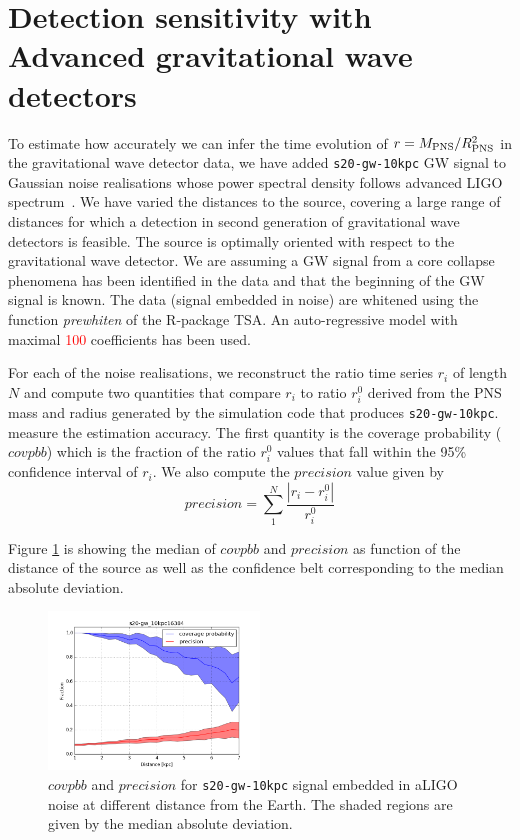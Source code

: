 \section{Detection sensitivity with Advanced gravitational wave detectors}
\label{sec:results}

To estimate how accurately we can infer the time evolution of $r=M_{\rm PNS}/R_{\rm PNS}^2$ in the
gravitational wave detector data, we have added {\tt s20-gw-10kpc} GW signal to 
Gaussian noise realisations whose power spectral density follows advanced LIGO
spectrum~\cite{aLIGOsens:2018}. 
We have varied the distances to the source, covering a large
range of distances for which a detection in second generation of gravitational wave detectors
is feasible. The source is optimally oriented with
respect to the gravitational wave detector. We are assuming a GW signal from a core collapse
phenomena has been identified in the data and that the beginning of the GW signal is known.
The data (signal embedded in noise) are whitened using the function {\it prewhiten} of the R-package TSA.
An auto-regressive model with maximal \textcolor{red}{100} coefficients has been used.    

For each of the noise realisations, we reconstruct the ratio time series {$r_i$}
of length $N$ and compute two quantities that compare {$r_i$} to ratio {$r_i^0$} derived from
the PNS mass and radius generated by the simulation code that produces {\tt s20-gw-10kpc}.
measure the estimation accuracy.
The first quantity is the coverage probability ($covpbb$) which is the fraction of the
ratio {$r_i^0$} values that fall within the 95\% confidence interval of {$r_i$}.
We also compute the $precision$ value given by
\begin{equation}
precision=\sum_1^N\frac{|r_i-r_i^0|}{r_i^0}
\end{equation}

Figure \ref{fig:s20results} is showing the median of $covpbb$ and $precision$ as
function of the distance of the source as well as the confidence belt corresponding
to the median absolute deviation.

\begin{figure}
  \centering
  \includegraphics[width=0.5\textwidth]{plots/s20-gw_10kpc16384_covpbb_prec}
 \caption{$covpbb$ and $precision$ for {\tt s20-gw-10kpc} signal embedded in aLIGO noise at different distance from the Earth. The shaded regions are given by the median absolute deviation.} \label{fig:s20results}
\end{figure}




